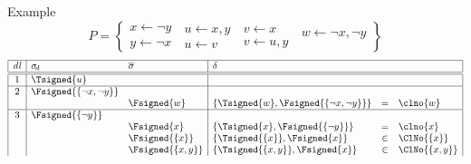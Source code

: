 \begin{frame}[shrink=0]{Example}
  \[
    P
    =
    \left\{
    \begin{array}{l}
      x  \leftarrow  \neg y \\
      y  \leftarrow  \neg x
    \end{array}
    \
    \begin{array}{l}
      u  \leftarrow x,y \\
      u  \leftarrow v
    \end{array}
    \
    \begin{array}{l}
      v  \leftarrow x \\
      v  \leftarrow u,y
    \end{array}
    \
    \begin{array}{l}
      w  \leftarrow \neg x,\neg y \\
      \mbox{~}
    \end{array}
    \right\}
  \]
  \medskip\footnotesize
  \[
    \begin{array}[b]{|c|ll|lcl|}
      \hline
      \mathit{dl} & \sigma_{\!d}                & \overline{\sigma}    & \delta                                            &     &
      \\\hline\hline
      1           & \Tsigned{u}                 &                      &                                                   &     &
      \\\hline
      2           & \Fsigned{\{\neg x,\neg y\}} &                      &                                                   &     &
      \\
                  &                             & \Fsigned{w}          & \{\Tsigned{w},\Fsigned{\{\neg x,\neg y\}}\}       & =   & \clno{w}
      \\\hline
      3           & \Fsigned{\{\neg y\}}        &                      &                                                   &     &
      \\
                  &                             & \Fsigned{x}          & \{\Tsigned{x},\Fsigned{\{\neg y\}}\}              & =   & \clno{x}
      \\
                  &                             & \Fsigned{\{x\}}      & \{\Tsigned{\{x\}},\Fsigned{x}\}                   & \in & \ClNo{\{x\}}
      \\
                  &                             & \Fsigned{\{x,y\}}    & \{\Tsigned{\{x,y\}},\Fsigned{x}\}                 & \in & \ClNo{\{x,y\}}
      \\

\end{array}\]
\end{frame}
